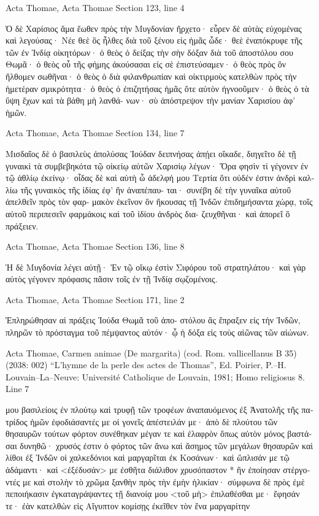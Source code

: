 \documentclass[12pt,letterpaper,twoside,final]{memoir}
\begin{document}
\begin{greek}
Acta Thomae, Acta Thomae 
Section 123, line 4

Ὁ δὲ Χαρίσιος ἅμα ἕωθεν πρὸς τὴν Μυγδονίαν 
ἤρχετο· εὗρεν δὲ αὐτὰς εὐχομένας καὶ λεγούσας· Νέε θεὲ ὃς 
ἦλθες διὰ τοῦ ξένου εἰς ἡμᾶς ὧδε· θεὲ ἐναπόκρυφε τῆς τῶν 
ἐν Ἰνδίᾳ οἰκητόρων· ὁ θεὸς ὁ δείξας τὴν σὴν δόξαν διὰ τοῦ 
ἀποστόλου σου Θωμᾶ· ὁ θεὸς οὗ τῆς φήμης ἀκούσασαι εἰς 
σὲ ἐπιστεύσαμεν· ὁ θεὸς πρὸς ὃν ἤλθομεν σωθῆναι· ὁ θεὸς 
ὁ διὰ φιλανθρωπίαν καὶ οἰκτιρμοὺς κατελθὼν πρὸς τὴν 
ἡμετέραν σμικρότητα· ὁ θεὸς ὁ ἐπιζητήσας ἡμᾶς ὅτε αὐτὸν 
ἠγνοοῦμεν· ὁ θεὸς ὁ τὰ ὕψη ἔχων καὶ τὰ βάθη μὴ λανθά-
νων· σὺ ἀπόστρεψον τὴν μανίαν Χαρισίου ἀφ' ἡμῶν. 



Acta Thomae, Acta Thomae 
Section 134, line 7

Μισδαῖος δὲ ὁ βασιλεὺς ἀπολύσας Ἰούδαν δειπνήσας 
ἀπῄει οἴκαδε, διηγεῖτο δὲ τῇ γυναικὶ τὰ συμβεβηκότα τῷ οἰκείῳ 
αὐτῶν Χαρισίῳ λέγων· Ὅρα φησὶν τί γέγονεν ἐν τῷ ἀθλίῳ 
ἐκείνῳ· οἶδας δὲ καὶ αὐτὴ ὦ ἀδελφή μου Τερτία ὅτι οὐδέν   
ἐστιν ἀνδρὶ καλλίω τῆς γυναικὸς τῆς ἰδίας ἐφ' ἣν ἀναπέπαυ-
ται· συνέβη δὲ τὴν γυναῖκα αὐτοῦ ἀπελθεῖν πρὸς τὸν φαρ-
μακὸν ἐκεῖνον ὃν ἤκουσας τῇ Ἰνδῶν ἐπιδημήσαντα χώρᾳ, τοῖς 
αὐτοῦ περιπεσεῖν φαρμάκοις καὶ τοῦ ἰδίου ἀνδρὸς δια-
ζευχθῆναι· καὶ ἀπορεῖ ὃ πράξειεν. 



Acta Thomae, Acta Thomae 
Section 136, line 8

                            Ἡ δὲ Μυγδονία λέγει αὐτῇ· Ἐν τῷ 
οἴκῳ ἐστὶν Σιφόρου τοῦ στρατηλάτου· καὶ γὰρ αὐτὸς γέγονεν 
πρόφασις πᾶσιν τοῖς ἐν τῇ Ἰνδίᾳ σῳζομένοις. 



Acta Thomae, Acta Thomae 
Section 171, line 2

Ἐπληρώθησαν αἱ πράξεις Ἰούδα Θωμᾶ τοῦ ἀπο-
στόλου ἃς ἔπραξεν εἰς τὴν Ἰνδῶν, πληρῶν τὸ πρόσταγμα τοῦ   
πέμψαντος αὐτόν· ᾧ ἡ δόξα εἰς τοὺς αἰῶνας τῶν αἰώνων. 



Acta Thomae, Carmen animae (De margarita) (cod. Rom. vallicellanus B 35) (2038: 002)
“L'hymne de la perle des actes de Thomas”, Ed. Poirier, P.–H.
Louvain–La–Neuve: Université Catholique de Louvain, 1981; Homo religiosus 8.
Line 7

μου βασιλείοις 
ἐν πλούτῳ καὶ τρυφῇ τῶν τροφέων ἀναπαυόμενος 
ἐξ Ἀνατολῆς τῆς πατρίδος ἡμῶν ἐφοδιάσαντές με οἱ 
γονεῖς ἀπέστειλάν με· 
ἀπὸ δὲ πλούτου τῶν θησαυρῶν τούτων φόρτον συνέθηκαν 
μέγαν τε καὶ ἐλαφρὸν ὅπως αὐτὸν μόνος βαστάσαι 
δυνηθῶ· 
χρυσός ἐστιν ὁ φόρτος τῶν ἄνω καὶ ἄσημος τῶν μεγάλων 
θησαυρῶν 
καὶ λίθοι ἐξ Ἰνδῶν οἱ χαλκεδόνιοι καὶ μαργαρῖται ἐκ 
Κοσάνων· 
καὶ ὥπλισάν με τῷ ἀδάμαντι· 
καὶ <ἐξέδυσάν> με ἐσθῆτα διάλιθον χρυσόπαστον * ἣν 
ἐποίησαν στέργοντές με 
καὶ στολὴν τὸ χρῶμα ξανθὴν πρὸς τὴν ἐμὴν ἡλικίαν· 
σύμφωνα δὲ πρὸς ἐμὲ πεποιήκασιν ἐγκαταγράψαντες τῇ 
διανοίᾳ μου <τοῦ μὴ> ἐπιλαθέσθαι με· ἔφησάν τε· 
ἐὰν κατελθὼν εἰς Αἴγυπτον κομίσῃς ἐκεῖθεν τὸν ἕνα 
μαργαρίτην 





\end{greek}
\end{document}
